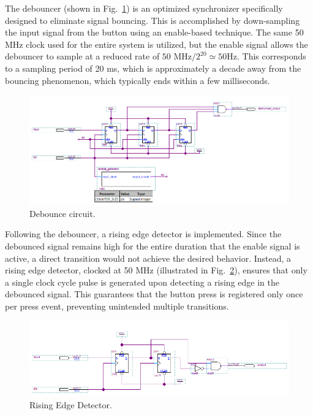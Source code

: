 \documentclass[11pt]{report}
\begin{document}
The debouncer (shown in Fig.~\ref{fig:debounce_circuit}) is an optimized synchronizer specifically designed to eliminate signal bouncing. This is accomplished by down-sampling the input signal from the button using an enable-based technique. The same 50 MHz clock used for the entire system is utilized, but the enable signal allows the debouncer to sample at a reduced rate of \(50\text{ MHz}/2^{20} \simeq 50\text{Hz}\). This corresponds to a sampling period of 20 ms, which is approximately a decade away from the bouncing phenomenon, which typically ends within a few milliseconds.

\begin{figure}[!h]
    \centering
    \includegraphics[width=0.8\linewidth]{images/controller/debounce_circuit.png}
    \caption{Debounce circuit.}
    \label{fig:debounce_circuit}
\end{figure}

Following the debouncer, a rising edge detector is implemented. Since the debounced signal remains high for the entire duration that the enable signal is active, a direct transition would not achieve the desired behavior. Instead, a rising edge detector, clocked at 50 MHz (illustrated in Fig.~\ref{fig:rising_edge_detector}), ensures that only a single clock cycle pulse is generated upon detecting a rising edge in the debounced signal. This guarantees that the button press is registered only once per press event, preventing unintended multiple transitions.

\begin{figure}[!h]
    \centering
    \includegraphics[width=0.8\linewidth]{images/controller/rising_edge_detector_circuit.png}
    \caption{Rising Edge Detector.}
    \label{fig:rising_edge_detector}
\end{figure}
\end{document}

